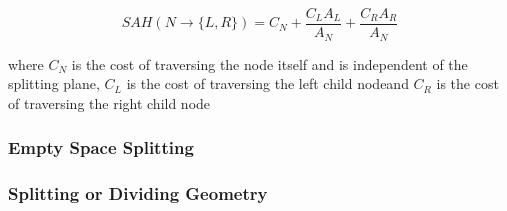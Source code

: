 

\begin{displaymath}
  SAH(N \rightarrow \{L, R\}) = C_N + \frac{C_L A_L}{A_N} +
  \frac{C_R A_R}{A_N}
\end{displaymath}

where $C_N$ is the cost of traversing the node itself and is
independent of the splitting plane, $C_L$ is the cost of traversing
the left child nodeand $C_R$ is the cost of traversing the right child
node




\subsubsection{Empty Space Splitting}



\subsubsection{Splitting or Dividing Geometry}






